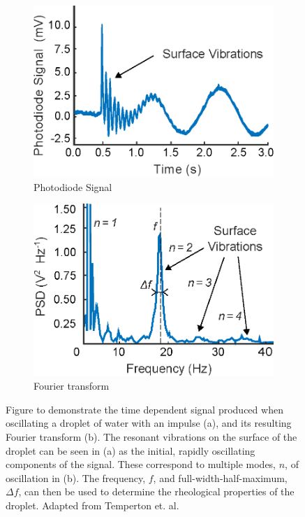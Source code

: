 \documentclass{physics_article_B}
\begin{document}
        \begin{figure}[H]
            \centering
                \begin{subfigure}[b]{0.48\textwidth}\hspace*{-0.2cm}\includegraphics[width=\textwidth]{Figures/TempertonSignal.eps}
                    \caption{Photodiode Signal}
                    \label{fig:temperton:signal}
                \end{subfigure}\hspace{3pt}
                \begin{subfigure}[b]{0.48\textwidth}\hspace*{0.2cm}\includegraphics[width=\textwidth]{Figures/TempertonSignalPD.eps}
                    \caption{Fourier transform}
                    \label{fig:temperton:PD}
                \end{subfigure}
            \caption{Figure to demonstrate the time dependent signal produced when oscillating a droplet of water with an impulse (a), and its resulting Fourier transform (b). The resonant vibrations on the surface of the droplet can be seen in (a) as the initial, rapidly oscillating components of the signal. These correspond to multiple modes, $n$, of oscillation in (b). The frequency, $f$, and full-width-half-maximum, $\Delta f$, can then be used to determine the rheological properties of the droplet. Adapted from Temperton et. al.\cite{temperton}}\label{fig:temperton}
        \end{figure}
\end{document}

